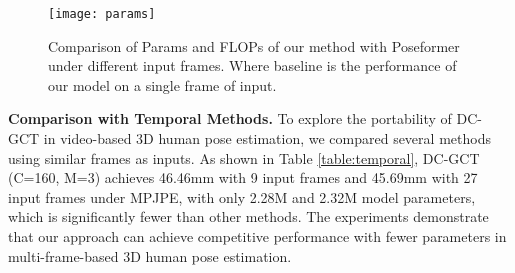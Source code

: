 \documentclass[journal]{IEEEtran}
\begin{document}
\begin{table}[t]
\caption{Quantitative comparison with temporal methods on Human3.6M. \textcolor{red}{Red}: best; \textcolor{blue}{Blue}: second best.}
\label{table:temporal}
\centering {}
\end{table}




\begin{figure}[t]
  \centering
  \texttt{[image: params]}
  \caption{Comparison of Params and FLOPs of our method with Poseformer\cite{zheng20213d} under different input frames. Where baseline is the performance of our model on a single frame of input.}
  \label{fig:params}
\end{figure}



{\bf{Comparison with Temporal Methods.}} To explore the portability of DC-GCT in video-based 3D human pose estimation, we compared several methods \cite{pavllo20193d,cai2019exploiting,zheng20213d,li2022mhformer,liu2020attention} using similar frames as inputs. As shown in Table \ref{table:temporal}, DC-GCT (C=160, M=3) achieves 46.46mm with 9 input frames and 45.69mm with 27 input frames under MPJPE, with only 2.28M and 2.32M model parameters, which is significantly fewer than other methods. The experiments demonstrate that our approach can achieve competitive performance with fewer parameters in multi-frame-based 3D human pose estimation. 
\end{document}

